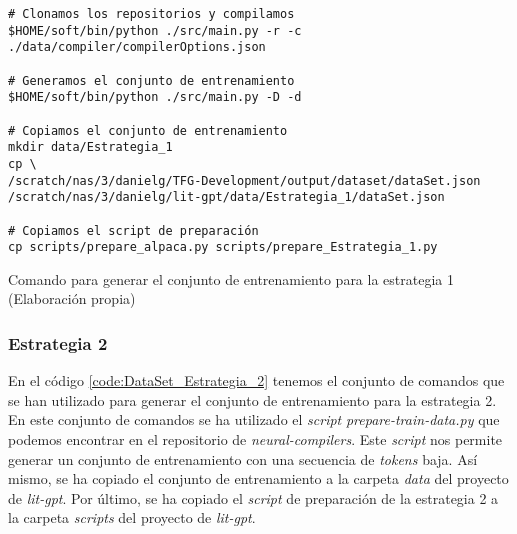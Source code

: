 \begin{mycode}
    \begin{verbatim}
# Clonamos los repositorios y compilamos
$HOME/soft/bin/python ./src/main.py -r -c ./data/compiler/compilerOptions.json

# Generamos el conjunto de entrenamiento
$HOME/soft/bin/python ./src/main.py -D -d

# Copiamos el conjunto de entrenamiento
mkdir data/Estrategia_1
cp \
/scratch/nas/3/danielg/TFG-Development/output/dataset/dataSet.json 
/scratch/nas/3/danielg/lit-gpt/data/Estrategia_1/dataSet.json

# Copiamos el script de preparación
cp scripts/prepare_alpaca.py scripts/prepare_Estrategia_1.py
    \end{verbatim}
    \caption[Comando para generar el conjunto de entrenamiento para la estrategia 1]{Comando para generar el conjunto de entrenamiento para la estrategia 1 (Elaboración propia)}
    \label{code:DataSet_Estrategia_1}
\end{mycode}

\subsubsection{Estrategia 2}
\label{subsubsec:creacion_conjunto:estrategia_2}


En el código \ref{code:DataSet_Estrategia_2} tenemos el conjunto de comandos que se han
utilizado para generar el conjunto de entrenamiento para la estrategia 2. En este conjunto
de comandos se ha utilizado el \textit{script} \textit{prepare-train-data.py} que podemos encontrar
en el repositorio de \textit{neural-compilers}. Este \textit{script} nos permite generar un conjunto
de entrenamiento con una secuencia de \textit{tokens} baja. Así mismo, se ha copiado el conjunto
de entrenamiento a la carpeta \textit{data} del proyecto de \textit{lit-gpt}. Por último,
se ha copiado el \textit{script} de preparación de la estrategia 2 a la carpeta \textit{scripts}
del proyecto de \textit{lit-gpt}.

